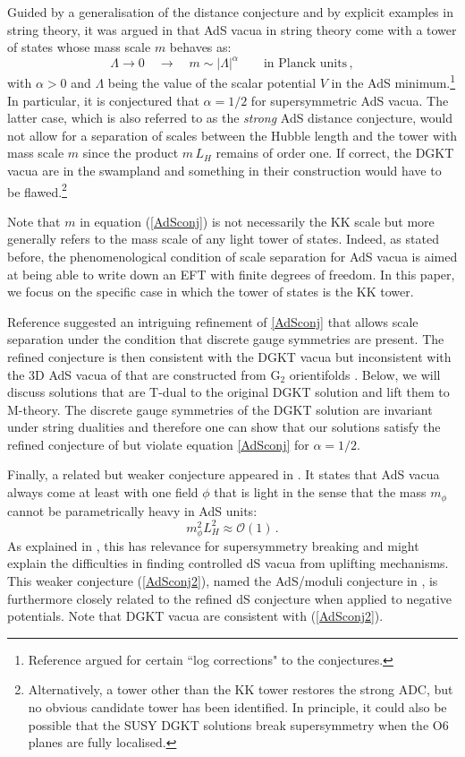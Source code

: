 \documentclass[11pt]{article}
\newcommand{\be}{\begin{equation}}
\newcommand{\ee}{\end{equation}}
\def\be{\begin{equation}}
\def\ee{\end{equation}}
\renewcommand{\[}{\left[}
\renewcommand{\]}{\right]}
\renewcommand{\(}{\left(}
\renewcommand{\)}{\right)}
\newcommand{\<}{\langle}
\renewcommand{\>}{\rangle}
\begin{document}
Guided by a generalisation of the distance conjecture \cite{Ooguri:2006in} and by explicit examples in string theory, it was argued in \cite{Lust:2019zwm} that AdS vacua in string theory come with a tower of states whose mass scale $m$ behaves as:
\be\label{AdSconj}
\Lambda\rightarrow 0\quad \longrightarrow\quad m\sim |\Lambda|^{\alpha}\qquad \text{in Planck units}\,, 
\ee
with $\alpha>0$ and $\Lambda$ being the value of the scalar potential $V$ in the AdS minimum.\footnote{Reference \cite{Blumenhagen:2019vgj} argued for certain ``log corrections" to the conjectures.}
In particular, it is conjectured that $\alpha=1/2$ for supersymmetric AdS vacua. The latter case, which is also referred to as the \emph{strong} AdS distance conjecture, would not allow for a separation of scales between the Hubble length and the tower with mass scale $m$ since the product $m\,L_H$ remains of order one. If correct, the DGKT vacua are in the swampland and something in their construction would have to be flawed.\footnote{Alternatively, a tower other than the KK tower restores the strong ADC, but no obvious candidate tower has been identified. In principle, it could also be possible that the SUSY DGKT solutions break supersymmetry when the O6 planes are fully localised.}

Note that $m$ in equation (\ref{AdSconj}) is not necessarily the KK scale but more generally refers to the mass scale of any light tower of states. Indeed, as stated before, the phenomenological condition of scale separation for AdS vacua is aimed at being able to write down an EFT with finite degrees of freedom. In this paper, we focus on the specific case in which the tower of states is the KK tower. 

Reference \cite{Buratti:2020kda} suggested an intriguing refinement of \eqref{AdSconj} that allows scale separation under the condition that discrete gauge symmetries are present. The refined conjecture is then consistent with the DGKT vacua but inconsistent with the 3D AdS vacua of \cite{Farakos:2020phe} that are constructed from G$_2$ orientifolds \cite{progress}. Below, we will discuss solutions that are T-dual to the original DGKT solution and lift them to M-theory. The discrete gauge symmetries of the DGKT solution are invariant under string dualities and therefore one can show that our solutions satisfy the refined conjecture of \cite{Buratti:2020kda} but violate equation \eqref{AdSconj} for $\alpha=1/2$.

Finally, a related but weaker conjecture appeared in \cite{Gautason:2018gln}. It states that AdS vacua always come at least with one field $\phi$ that is light in the sense that the mass $m_{\phi}$ cannot be parametrically heavy in AdS units:
\be \label{AdSconj2}
m^2_{\phi}L_{H}^2 \approx \mathcal{O}(1)\,.
\ee
As explained in \cite{Gautason:2018gln}, this has relevance for supersymmetry breaking and might explain the difficulties in finding controlled dS vacua from uplifting mechanisms. This weaker conjecture (\ref{AdSconj2}), named the AdS/moduli conjecture in \cite{Blumenhagen:2019vgj}, is furthermore closely related to the refined dS conjecture \cite{Andriot:2018wzk, Garg:2018reu, Ooguri:2018wrx} when applied to negative potentials. Note that DGKT vacua are consistent with (\ref{AdSconj2}).
\end{document}
